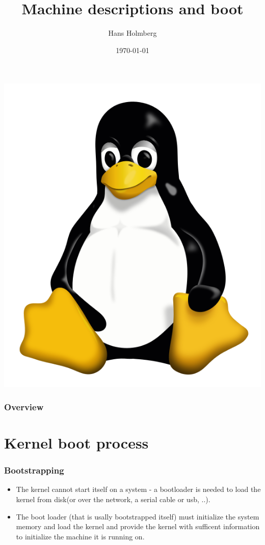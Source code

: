 \documentclass{beamer}
\title[TLKDCC Machine descriptions and boot]{Machine descriptions and boot}
\author{Hans Holmberg}
\institute[LKTP]
{
Linux Kernel Teaching Project \\ 
\medskip
\textit{hans.holmberg@gmail.com}
}
\date{\today}
\begin{document}
\begin{frame}
\titlepage
\includegraphics{tux} 
\end{frame}

\begin{frame}
\frametitle{Overview}
\tableofcontents 
\end{frame}

\section{Kernel boot process}

\begin{frame}
\frametitle{Bootstrapping}
\begin{itemize}
	\item The kernel cannot start itself on a system - a bootloader is needed to load the kernel from disk(or over the network,  a serial cable or usb, ..).
	\item The boot loader (that is usally bootstrapped itself) must initialize the system memory and load the kernel and provide the kernel with sufficent information to initialize the machine it is running on.
\end{itemize}
\end{frame}
\end{document}
